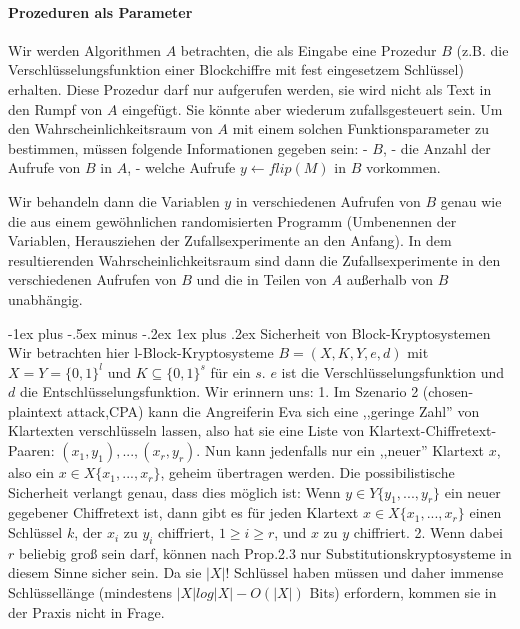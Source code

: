 \documentclass[a4paper]{article}
\makeatletter
\renewcommand{\subsubsection}{\@startsection{subsubsection}{3}{0mm}%
 {-1ex plus -.5ex minus -.2ex}%
 {1ex plus .2ex}%
 {\normalfont\small\bfseries}}
\makeatother
\begin{document}
\begin{multicols}{3}
    \paragraph{Prozeduren als Parameter}
    Wir werden Algorithmen $A$ betrachten, die als Eingabe eine Prozedur $B$ (z.B. die Verschlüsselungsfunktion einer Blockchiffre mit fest eingesetzem Schlüssel) erhalten. Diese Prozedur darf nur aufgerufen werden, sie wird nicht als Text in den Rumpf von $A$ eingefügt. Sie könnte aber wiederum zufallsgesteuert sein. Um den Wahrscheinlichkeitsraum von $A$ mit einem solchen Funktionsparameter zu bestimmen, müssen folgende Informationen gegeben sein:
    - $B$,
    - die Anzahl der Aufrufe von $B$ in $A$,
    - welche Aufrufe $y\leftarrow flip(M)$ in $B$ vorkommen.

    Wir behandeln dann die Variablen $y$ in verschiedenen Aufrufen von $B$ genau wie die aus einem gewöhnlichen randomisierten Programm (Umbenennen der Variablen, Herausziehen der Zufallsexperimente an den Anfang). In dem resultierenden Wahrscheinlichkeitsraum sind dann die Zufallsexperimente in den verschiedenen Aufrufen von $B$ und die in Teilen von $A$ außerhalb von $B$ unabhängig.

    \subsubsection{Sicherheit von Block-Kryptosystemen}
    Wir betrachten hier l-Block-Kryptosysteme $B=(X,K,Y,e,d)$ mit $X=Y=\{0,1\}^l$ und $K\subseteq\{0,1\}^s$ für ein $s$. $e$ ist die Verschlüsselungsfunktion und $d$ die Entschlüsselungsfunktion. Wir erinnern uns:
    1. Im Szenario 2 (chosen-plaintext attack,CPA) kann die Angreiferin Eva sich eine ,,geringe Zahl'' von Klartexten verschlüsseln lassen, also hat sie eine Liste von Klartext-Chiffretext-Paaren: $(x_1,y_1),...,(x_r,y_r)$. Nun kann jedenfalls nur ein ,,neuer'' Klartext $x$, also ein $x\in X\{x_1,...,x_r\}$, geheim übertragen werden. Die possibilistische Sicherheit verlangt genau, dass dies möglich ist: Wenn $y\in Y\{y_1,...,y_r\}$ ein neuer gegebener Chiffretext ist, dann gibt es für jeden Klartext $x\in X\{x_1,...,x_r\}$ einen Schlüssel $k$, der $x_i$ zu $y_i$ chiffriert, $1 \geq i\geq r$, und $x$ zu $y$ chiffriert.
    2. Wenn dabei $r$ beliebig groß sein darf, können nach Prop.2.3 nur Substitutionskryptosysteme in diesem Sinne sicher sein. Da sie $|X|!$ Schlüssel haben müssen und daher immense Schlüssellänge (mindestens $|X|log|X|-O(|X|)$ Bits) erfordern, kommen sie in der Praxis nicht in Frage.


\end{multicols}
\end{document}
